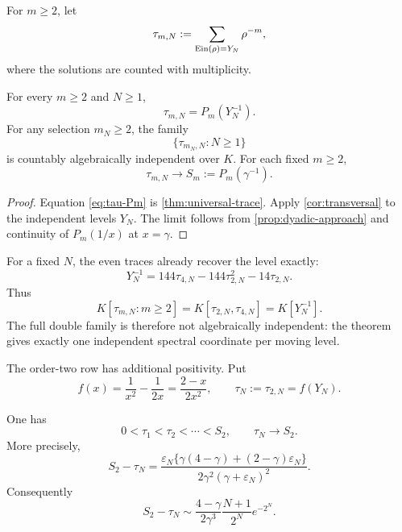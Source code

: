 For \(m\ge2\), let
\begin{equation}\label{eq:tau-mN}
 \tau_{m,N}:=\sum_{\operatorname{Ein}(\rho)=Y_N}\rho^{-m},
\end{equation}
where the solutions are counted with multiplicity.

\begin{theorem}
\label{thm:all-order-tower}
For every \(m\ge2\) and \(N\ge1\),
\begin{equation}\label{eq:tau-Pm}
 \tau_{m,N}=P_m(Y_N^{-1}).
\end{equation}
For any selection \(m_N\ge2\), the family
\[
 \{\tau_{m_N,N}:N\ge1\}
\]
is countably algebraically independent over \(K\).  For each fixed
\(m\ge2\),
\begin{equation}\label{eq:tau-limit}
 \tau_{m,N}\longrightarrow S_m:=P_m(\gamma^{-1}).
\end{equation}
\end{theorem}

\begin{proof}
Equation \eqref{eq:tau-Pm} is \cref{thm:universal-trace}.  Apply
\cref{cor:transversal} to the independent levels \(Y_N\).  The limit follows
from \cref{prop:dyadic-approach} and continuity of \(P_m(1/x)\) at
\(x=\gamma\).
\end{proof}

\begin{remark}
For a fixed \(N\), the even traces already recover the level exactly:
\begin{equation}\label{eq:YN-even-recovery}
 \boxed{\displaystyle
 Y_N^{-1}=144\tau_{4,N}-144\tau_{2,N}^2-14\tau_{2,N}.}
\end{equation}
Thus
\[
 K[\tau_{m,N}:m\ge2]
 =K[\tau_{2,N},\tau_{4,N}]
 =K[Y_N^{-1}].
\]
The full double family is therefore not algebraically independent: the
theorem gives exactly one independent spectral coordinate per moving level.
\end{remark}

The order-two row has additional positivity.  Put
\begin{equation}\label{eq:f-def}
 f(x)=\frac1{x^2}-\frac1{2x}=\frac{2-x}{2x^2},
 \qquad \tau_N:=\tau_{2,N}=f(Y_N).
\end{equation}

\begin{theorem}
\label{thm:tau2-convergence}
One has
\[
 0<\tau_1<\tau_2<\cdots<S_2,
 \qquad \tau_N\longrightarrow S_2.
\]
More precisely,
\begin{equation}\label{eq:S2-tail-exact}
 \boxed{\displaystyle
 S_2-\tau_N=
 \frac{\varepsilon_N
 \{\gamma(4-\gamma)+(2-\gamma)\varepsilon_N\}}
 {2\gamma^2(\gamma+\varepsilon_N)^2}.}
\end{equation}
Consequently
\begin{equation}\label{eq:S2-tail-asymptotic}
 S_2-\tau_N\sim
 \frac{4-\gamma}{2\gamma^3}
 \frac{N+1}{2^N}e^{-2^N}.
\end{equation}
\end{theorem}

